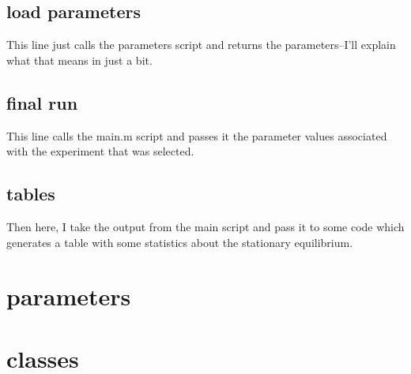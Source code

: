 \documentclass{article}
\begin{document}
	\subsection{load parameters}
		This line just calls the parameters script and returns the parameters--I'll explain what that means in just a bit.
	\subsection{final run}
		This line calls the main.m script and passes it the parameter values associated with the experiment that was selected.
	\subsection{tables}
		Then here, I take the output from the main script and pass it to some code which generates a table with some statistics about the stationary equilibrium.
		
\section{parameters}
		
\section{classes}
\end{document}
